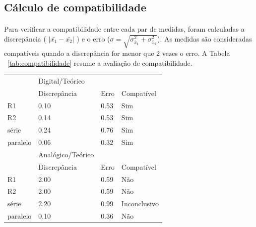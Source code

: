 \documentclass[11pt,a4paper]{article}
\begin{document}
    \clearpage
    \subsection{Cálculo de compatibilidade}
    
      \paragraph{}
      Para verificar a compatibilidade entre cada par de medidas, foram calculadas a discrepância ( $|\bar{x_1}-\bar{x_2}|$ ) e o erro ($\sigma = \sqrt{\sigma_{\bar{x}_1}^2 + \sigma_{\bar{x}_2}^2}$). As medidas são consideradas compatíveis quando a discrepância for menor que 2 vezes o erro. A Tabela ~\ref{tab:compatibilidade} resume a avaliação de compatibilidade.

       \begin{table}[htb!]
        \centering
        \begin{tabular}{llll}
        \toprule
                   & Digital/Teórico   &      &                                     \\
                   & Discrepância      & Erro & Compatível                          \\
          \midrule
          R1       & 0.10              & 0.53 & {\color[HTML]{009901} Sim}          \\
          R2       & 0.14              & 0.53 & {\color[HTML]{009901} Sim}          \\
          série    & 0.24              & 0.76 & {\color[HTML]{009901} Sim}          \\
          paralelo & 0.06              & 0.32 & {\color[HTML]{009901} Sim}          \\
          \midrule
                   & Analógico/Teórico &      &                                     \\
                   & Discrepância      & Erro & Compatível                          \\
          \midrule
          R1       & 2.00              & 0.59 & {\color[HTML]{CB0000} Não}          \\
          R2       & 2.00              & 0.59 & {\color[HTML]{CB0000} Não}          \\
          série    & 2.20              & 0.99 & {\color[HTML]{646809} Inconclusivo} \\
          paralelo & 0.10              & 0.36 & {\color[HTML]{CB0000} Não}          \\

\end{tabular}
\end{table}
\end{document}
